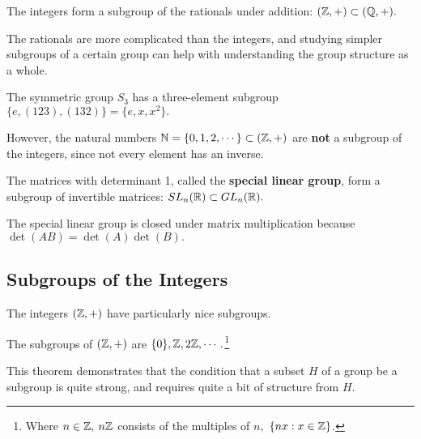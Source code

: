 \begin{example}
The integers form a subgroup of the rationals under addition: $(\mathbb Z, +) \subset (\mathbb Q, +).$
\end{example}
The rationals are more complicated than the integers, and studying simpler subgroups of a certain group can help with understanding the group structure as a whole.

\begin{example}
The symmetric group $S_3$ has a three-element subgroup $\{e, (123), (132)\} = \{e, x, x^2\}.$
\end{example}

However, the natural numbers $\mathbb N = \{0, 1, 2, \cdots \} \subset (\mathbb Z, +)$ are \textbf{not} a subgroup of the integers, since not every element has an inverse.

\begin{example}
The matrices with determinant 1, called the \textbf{special linear group}, form a subgroup of invertible matrices: $SL_n(\mathbb R) \subset GL_n(\mathbb R).$
\end{example}
The special linear group is closed under matrix multiplication because $\det(AB) = \det(A)\det(B).$ 

\subsection{Subgroups of the Integers}
The integers $(\mathbb Z, +)$ have particularly nice subgroups. 
\begin{theorem}\label{subgroup of z}
The subgroups of $(\mathbb Z, +)$ are $\{0\}, \mathbb Z, 2\mathbb Z, \cdots.$\footnote{Where $n \in \mathbb Z,$ $n\mathbb Z$ consists of the multiples of $n,$ $\{nx: x \in \mathbb Z\}$.}
\end{theorem}

This theorem demonstrates that the condition that a subset $H$ of a group be a subgroup is quite strong, and requires quite a bit of structure from $H.$

